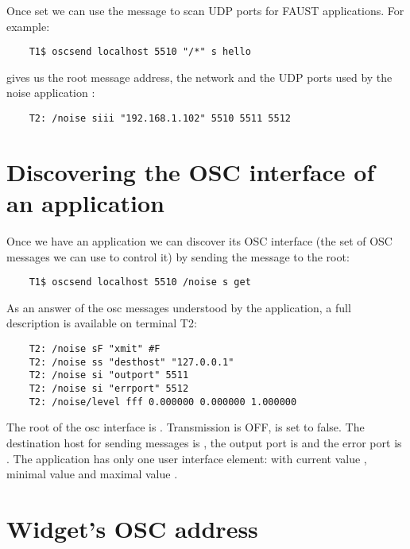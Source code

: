 Once set we can use the  message  to scan UDP ports for FAUST applications. For example:
\begin{lstlisting}
	T1$ oscsend localhost 5510 "/*" s hello
\end{lstlisting}

gives us the root message address, the network and the UDP ports used by the noise application :
\begin{lstlisting}
	T2: /noise siii "192.168.1.102" 5510 5511 5512
\end{lstlisting}


\section{Discovering the OSC interface of an application}

Once we have an application we can discover its OSC interface (the set of OSC messages we can use to control it) by sending the  message to the root:
\begin{lstlisting}
	T1$ oscsend localhost 5510 /noise s get 
\end{lstlisting}

As an answer of the osc messages  understood by the application, a full description is available on terminal T2:
\begin{lstlisting}
	T2: /noise sF "xmit" #F
	T2: /noise ss "desthost" "127.0.0.1"
	T2: /noise si "outport" 5511
	T2: /noise si "errport" 5512
	T2: /noise/level fff 0.000000 0.000000 1.000000
\end{lstlisting}

The root of the osc interface is . Transmission is OFF,  is set to false. The destination host for sending messages is , the output port is  and the error port is . The application has only one user interface element:  with current value , minimal value  and maximal value .



\section{Widget's OSC address}


